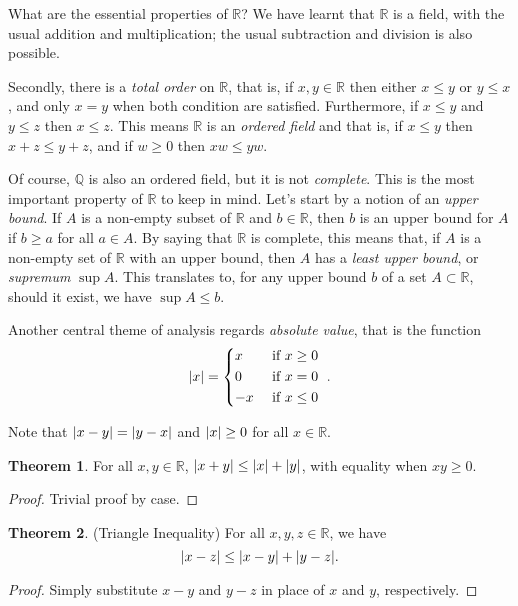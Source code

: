 \documentclass[12pt]{book}
\newcommand{\QQ}{\mathbb Q}
\newcommand{\RR}{\mathbb R}
\theoremstyle{definition}
\newtheorem{theorem}{Theorem}[chapter]
\theoremstyle{remark}
\DeclarePairedDelimiter\abs{\lvert}{\rvert}
\begin{document}
		What are the essential properties of $\RR$? We have learnt that $\RR$ is a field, with the usual addition and multiplication; the usual subtraction and division is also possible.
		
		Secondly, there is a \textit{total order} on $\RR$, that is, if $x, y \in \RR$ then either $x \leq y$ or $y \leq x$, and only $x = y$ when both condition are satisfied. Furthermore, if $x \leq y$ and $y \leq z$ then $x \leq z$. This means $\RR$ is an \textit{ordered field} and that is, if $x \leq y$ then $x + z \leq y + z$, and if $w \geq 0$ then $xw \leq yw$.
		
		Of course, $\QQ$ is also an ordered field, but it is not \textit{complete}. This is the most important property of $\RR$ to keep in mind. Let's start by a notion of an \textit{upper bound}. If $A$ is a non-empty subset of $\RR$ and $b \in \RR$, then $b$ is an upper bound for $A$ if $b \geq a$ for all $a \in A$. By saying that $\RR$ is complete, this means that, if $A$ is a non-empty set of $\RR$ with an upper bound, then $A$ has a \textit{least upper bound}, or \textit{supremum} $\sup A$. This translates to, for any upper bound $b$ of a set $A \subset \RR$, should it exist, we have $\sup A \leq b$.
		
		Another central theme of analysis regards \textit{absolute value}, that is the function
		\begin{equation}\abs{x} = 
		\begin{cases*}
			x & \text{ if $x \geq 0$}\\
			0 & \text{ if $x = 0$} \\
			-x & \text{ if $x \leq 0$}
		\end{cases*}.
		\end{equation}
		
		Note that $\abs{x - y} = \abs{y - x}$ and $\abs{x} \geq 0$ for all $x \in \RR$. 
		\begin{theorem}
			For all $x, y \in \RR$, $\abs{x + y} \leq \abs{x} + \abs{y}$, with equality when $ xy \geq 0$.
		\end{theorem}
		\begin{proof}
			Trivial proof by case.
		\end{proof}
		\begin{theorem}(Triangle Inequality)
			For all $x, y, z \in \RR$, we have
			\begin{equation}
				\abs{x - z} \leq \abs{x - y} + \abs{y - z}.
			\end{equation}
		\end{theorem}
		\begin{proof}
			Simply substitute $x - y$ and $y - z$ in place of $x$ and $y$, respectively.
		\end{proof}
\end{document}
